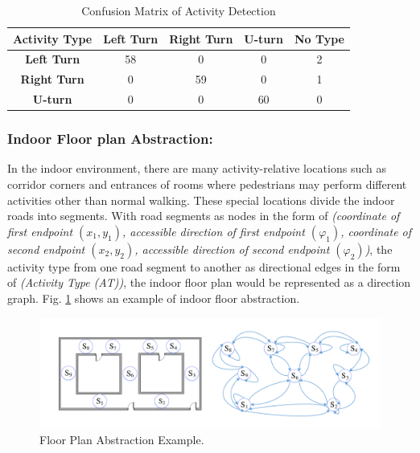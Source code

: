 \documentclass{llncs}
\begin{document}
\vspace{-10pt}
\begin{table}
	\label{table_conf}
	\caption{Confusion Matrix of Activity Detection}
	\begin{center}
		\begin{tabular}{| c || c | c | c | c |}
			\hline
			\bfseries Activity Type & \bfseries Left Turn & \bfseries Right Turn & \bfseries U-turn & \bfseries No Type\\
			\hline\hline
			\bfseries Left Turn & 58 & 0 & 0 & 2 \\
			\hline
			\bfseries Right Turn & 0 & 59 & 0 & 1 \\
			\hline
			\bfseries U-turn & 0 & 0 & 60 & 0 \\
			\hline
		\end{tabular}
	\end{center}
\end{table}
\vspace{-30pt}

\subsubsection{Indoor Floor plan Abstraction:}

In the indoor environment, there are many activity-relative locations such as corridor corners and entrances of rooms where pedestrians may perform different activities other than normal walking. These special locations divide the indoor roads into segments. With road segments as nodes in the form of \emph{(coordinate of first endpoint $(x_1,y_1)$, accessible direction of first endpoint $({\varphi}_1)$, coordinate of second endpoint $(x_2,y_2)$, accessible direction of second endpoint $({\varphi}_2)$)}, the activity type from one road segment to another as directional edges in the form of \emph{(Activity Type (AT))}, the indoor floor plan would be represented as a direction graph. Fig. \ref{fig-abstract} shows an example of indoor floor abstraction. 

\vspace{-10pt}
\begin{figure}[!htbp]
	\centering
	\includegraphics[width=4.576in]{AiFiMatch-MapAbstract}
	\caption{Floor Plan Abstraction Example.}
	\label{fig-abstract}
\end{figure}
\vspace{-20pt}
\end{document}
